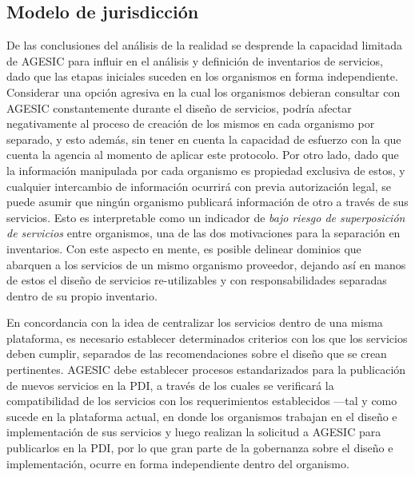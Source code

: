 \documentclass[11pt]{article}
\begin{document}
		\subsection{Modelo de jurisdicción}
			\label{subsec:modelo_de_jurisdiccion}
			De las conclusiones del análisis de la realidad se desprende la capacidad limitada de AGESIC para influir en el análisis y definición de inventarios de servicios, dado que las etapas iniciales suceden en los organismos en forma independiente. Considerar una opción agresiva en la cual los organismos debieran consultar con AGESIC constantemente durante el diseño de servicios, podría afectar negativamente al proceso de creación de los mismos en cada organismo por separado, y esto además, sin tener en cuenta la capacidad de esfuerzo con la que cuenta la agencia al momento de aplicar este protocolo. Por otro lado, dado que la información manipulada por cada organismo es propiedad exclusiva de estos, y cualquier intercambio de información ocurrirá con previa autorización legal, se puede asumir que ningún organismo publicará información de otro a través de sus servicios. Esto es interpretable como un indicador de \emph{bajo riesgo de superposición de servicios} entre organismos, una de las dos motivaciones para la separación en inventarios. Con este aspecto en mente, es posible delinear dominios que abarquen a los servicios de un mismo organismo proveedor, dejando así en manos de estos el diseño de servicios re-utilizables y con responsabilidades separadas dentro de su propio inventario.

			En concordancia con la idea de centralizar los servicios dentro de una misma plataforma, es necesario establecer determinados criterios con los que los servicios deben cumplir, separados de las recomendaciones sobre el diseño que se crean pertinentes. AGESIC debe establecer procesos estandarizados para la publicación de nuevos servicios en la PDI, a través de los cuales se verificará la compatibilidad de los servicios con los requerimientos establecidos —tal y como sucede en la plataforma actual, en donde los organismos trabajan en el diseño e implementación de sus servicios y luego realizan la solicitud a AGESIC para publicarlos en la PDI, por lo que gran parte de la gobernanza sobre el diseño e implementación, ocurre en forma independiente dentro del organismo.
\end{document}
